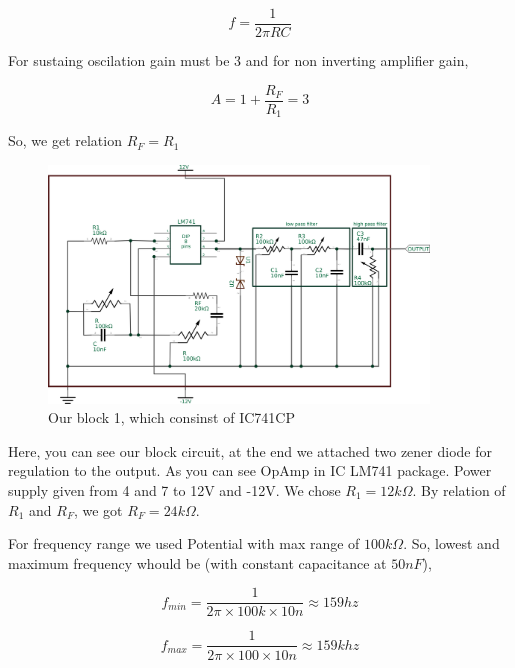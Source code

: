 \documentclass[14pt,a4paper]{extarticle}
\begin{document}
\begin{equation}
\label{eq:orgc972d68}
  f =\frac{1}{2 \pi RC}
\end{equation}

For sustaing oscilation gain must be 3 and for non inverting amplifier gain, 

\begin{equation}
\label{eq:org842bf25}
  A = 1+\frac{R_{F}}{R_{1}} = 3
\end{equation}

So, we get relation \(R_{F}=R_{1}\)

\begin{figure}[ht]
    \centering
    \includegraphics[width=0.9\textwidth]{imgs/sinereal.png}
    \caption{Our block 1, which consinst of IC741CP}
    \label{fig:realsine}
\end{figure}


Here, you can see our block circuit, at the end we attached two zener diode for regulation to the output. As you can see OpAmp in IC LM741 package. Power supply given from  4 and 7 to 12V and -12V. We chose \(R_{1}=12k\Omega\). By relation of \(R_{1}\) and \(R_{F}\), we got \(R_{F}=24k\Omega\).

For frequency range we used Potential with max range of \(100k\Omega\). So, lowest and maximum frequency whould be (with constant capacitance at \(50nF\)),

\begin{equation*}
\label{eq:orgac3d6e6}
  f_{min} = \frac{1}{2\pi\times100k\times 10n} \approx 159 hz
\end{equation*}

\begin{equation*}
\label{eq:org100a695}
  f_{max} = \frac{1}{2\pi\times100\times 10n} \approx 159k hz
\end{equation*}
\end{document}
